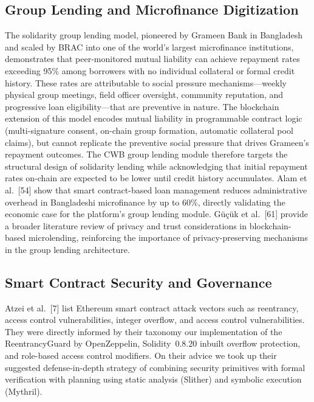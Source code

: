 \documentclass[12pt,a4paper]{report}
\begin{document}
\subsection{Group Lending and Microfinance Digitization}

The solidarity group lending model, pioneered by Grameen Bank in Bangladesh and scaled by BRAC into one of the world's largest microfinance institutions, demonstrates that peer-monitored mutual liability can achieve repayment rates exceeding 95\% among borrowers with no individual collateral or formal credit history. These rates are attributable to social pressure mechanisms---weekly physical group meetings, field officer oversight, community reputation, and progressive loan eligibility---that are preventive in nature. The blockchain extension of this model encodes mutual liability in programmable contract logic (multi-signature consent, on-chain group formation, automatic collateral pool claims), but cannot replicate the preventive social pressure that drives Grameen's repayment outcomes. The CWB group lending module therefore targets the structural design of solidarity lending while acknowledging that initial repayment rates on-chain are expected to be lower until credit history accumulates. Alam et al.~[54] show that smart contract-based loan management reduces administrative overhead in Bangladeshi microfinance by up to 60\%, directly validating the economic case for the platform's group lending module. Güçük et al.~[61] provide a broader literature review of privacy and trust considerations in blockchain-based microlending, reinforcing the importance of privacy-preserving mechanisms in the group lending architecture.

\subsection{Smart Contract Security and Governance}

Atzei et al.~[7] list Ethereum smart contract attack vectors such as reentrancy, access control vulnerabilities, integer overflow, and access control vulnerabilities. They were directly informed by their taxonomy our implementation of the ReentrancyGuard by OpenZeppelin, Solidity~0.8.20 inbuilt overflow protection, and role-based access control modifiers. On their advice we took up their suggested defense-in-depth strategy of combining security primitives with formal verification with planning using static analysis (Slither) and symbolic execution (Mythril).
\end{document}
